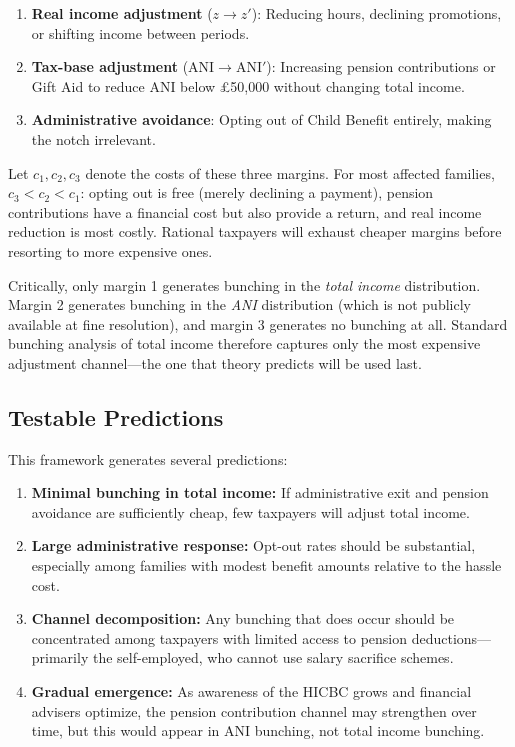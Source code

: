 \documentclass[12pt]{article}
\begin{document}
\begin{enumerate}
    \item \textbf{Real income adjustment} ($z \to z'$): Reducing hours, declining promotions, or shifting income between periods.
    \item \textbf{Tax-base adjustment} ($\text{ANI} \to \text{ANI}'$): Increasing pension contributions or Gift Aid to reduce ANI below \pounds50,000 without changing total income.
    \item \textbf{Administrative avoidance}: Opting out of Child Benefit entirely, making the notch irrelevant.
\end{enumerate}

Let $c_1, c_2, c_3$ denote the costs of these three margins. For most affected families, $c_3 < c_2 < c_1$: opting out is free (merely declining a payment), pension contributions have a financial cost but also provide a return, and real income reduction is most costly. Rational taxpayers will exhaust cheaper margins before resorting to more expensive ones.

Critically, only margin 1 generates bunching in the \emph{total income} distribution. Margin 2 generates bunching in the \emph{ANI} distribution (which is not publicly available at fine resolution), and margin 3 generates no bunching at all. Standard bunching analysis of total income therefore captures only the most expensive adjustment channel---the one that theory predicts will be used last.

\subsection{Testable Predictions}

This framework generates several predictions:

\begin{enumerate}
    \item \textbf{Minimal bunching in total income:} If administrative exit and pension avoidance are sufficiently cheap, few taxpayers will adjust total income.
    \item \textbf{Large administrative response:} Opt-out rates should be substantial, especially among families with modest benefit amounts relative to the hassle cost.
    \item \textbf{Channel decomposition:} Any bunching that does occur should be concentrated among taxpayers with limited access to pension deductions---primarily the self-employed, who cannot use salary sacrifice schemes.
    \item \textbf{Gradual emergence:} As awareness of the HICBC grows and financial advisers optimize, the pension contribution channel may strengthen over time, but this would appear in ANI bunching, not total income bunching.
\end{enumerate}
\end{document}
